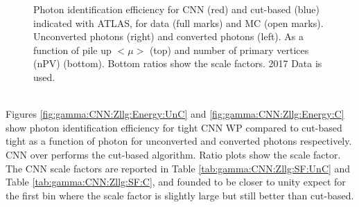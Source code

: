 \begin{figure}[htbp]
	\begin{tcolorbox}[colback=black!5!white,colframe=white!75!black]
    \caption{Photon identification efficiency for CNN (red) and cut-based (blue) indicated with ATLAS, for data (full marks) and MC (open marks). Unconverted photons (right) and converted photons (left). As a function of pile up $<\mu>$ (top) and number of primary vertices (nPV) (bottom). Bottom ratios show the scale factors. 2017 Data is used.}
    \label{fig:gamma:CNN:Zllg:MU}
    \end{tcolorbox}
    
\end{figure}
\\
Figures \ref{fig:gamma:CNN:Zllg:Energy:UnC} and \ref{fig:gamma:CNN:Zllg:Energy:C} show photon identification efficiency for tight CNN WP compared to cut-based tight as a function of photon \eT for unconverted and converted photons respectively. CNN over performs the cut-based algorithm. Ratio plots show the scale factor. The CNN scale factors are reported in Table \ref{tab:gamma:CNN:Zllg:SF:UnC} and Table \ref{tab:gamma:CNN:Zllg:SF:C}, and founded to be closer to unity expect for the first \eT bin where the scale factor is slightly large but still better than cut-based. 
